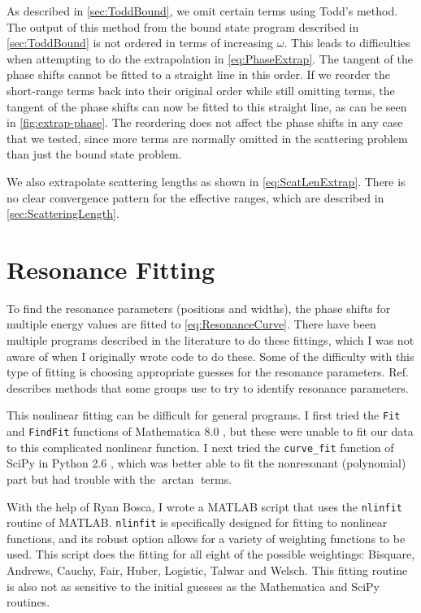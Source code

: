 \documentclass[Dissertation.tex]{subfiles}
\begin{document}
As described in \cref{sec:ToddBound}, we omit certain terms using 
Todd's method. The output of this method from the bound state program 
described in \cref{sec:ToddBound} is not ordered in terms of 
increasing $\omega$. This leads to difficulties when attempting to do the 
extrapolation in \cref{eq:PhaseExtrap}. The tangent of the phase 
shifts cannot be fitted to a straight line in this order. If we reorder the 
short-range terms back into their original order while still omitting terms, 
the tangent of the phase shifts can now be fitted to this straight line, as 
can be seen in \cref{fig:extrap-phase}. The reordering does not affect 
the phase shifts in any case that we tested, since more terms are normally 
omitted in the scattering problem than just the bound state problem.

We also extrapolate scattering lengths as shown in \cref{eq:ScatLenExtrap}.
There is no clear convergence pattern for the effective ranges, which are
described in \cref{sec:ScatteringLength}.



\section{Resonance Fitting}
\label{sec:ResonanceFit}

To find the resonance parameters (positions and widths), the phase shifts for 
multiple energy values are fitted to \cref{eq:ResonanceCurve}. There have 
been multiple programs described in the literature
\cite{Tennyson1984, Stibbe1998, Sochi2013} to do these fittings, which I
was not aware of when I 
originally wrote code to do these. Some of the difficulty with this type of 
fitting is choosing appropriate guesses for the resonance parameters.
Ref.~\cite{Sochi2013} describes methods that some groups use to try to identify 
resonance parameters.

This nonlinear fitting can be difficult for general programs. I first tried 
the \texttt{Fit} and \texttt{FindFit} functions of
Mathematica\textsuperscript{\textregistered} 8.0 \cite{Mathematica}, but these were unable to fit our 
data to this complicated nonlinear function. I next tried the
\texttt{curve\_fit} function of SciPy \cite{SciPy} in Python\textsuperscript{\textregistered}
2.6 \cite{Python}, which was better able to fit the nonresonant (polynomial) 
part but had trouble with the $\arctan$ terms.

With the help of Ryan Bosca, I wrote a MATLAB\textsuperscript{\textregistered}
\cite{matlab} script that uses the \texttt{nlinfit} routine of MATLAB. 
\texttt{nlinfit} is specifically designed for fitting to nonlinear functions, 
and its robust option allows for a variety of weighting functions to be used. 
This script does the fitting for all eight of the possible weightings: 
Bisquare, Andrews, Cauchy, Fair, Huber, Logistic, Talwar and Welsch. This 
fitting routine is also not as sensitive to the initial guesses as the 
Mathematica and SciPy routines.
\end{document}
